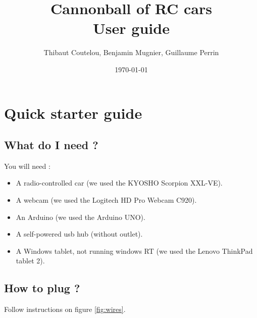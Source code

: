 \documentclass[a4paper,11pt]{report}
\title{Cannonball of RC cars\\User guide}
\author{Thibaut Coutelou, Benjamin Mugnier, Guillaume Perrin}
\date{\today}
\begin{document}
\maketitle
\tableofcontents

\setlength{\parskip}{3mm}










\chapter{Quick starter guide}

\section{What do I need ?}

You will need :
\begin{itemize}

    \item A radio-controlled car (we used the KYOSHO Scorpion XXL-VE).

    \item A webcam (we used the Logitech HD Pro Webcam C920).

    \item An Arduino (we used the Arduino UNO).

    \item A self-powered usb hub (without outlet).

    \item A Windows tablet, not running windows RT (we used the Lenovo ThinkPad
        tablet 2).

\end{itemize}

\section{How to plug ?}

Follow instructions on figure \ref{fig:wires}.
\end{document}
